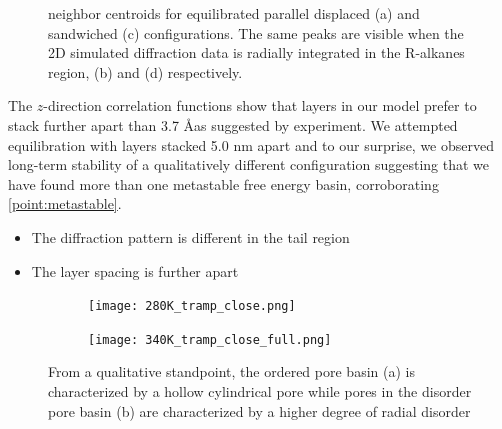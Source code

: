 \documentclass{article}
\newcommand{\angstrom}{\textup{\AA}}
\begin{document}
\begin{figure}
{  neighbor centroids for equilibrated parallel displaced (a) and sandwiched (c) configurations. The
  same peaks are visible when the 2D simulated diffraction data is radially integrated in the R-alkanes region,
  (b) and (d) respectively.}~\label{fig:tail_packing}
  \end{figure}

  The $z$-direction correlation functions show that layers in our model prefer
  to stack further apart than 3.7 \angstrom as suggested by experiment. We
  attempted equilibration with layers stacked 5.0 nm apart and to our surprise,
  we observed long-term stability of a qualitatively different configuration
  suggesting that we have found more than one metastable free energy basin,
  corroborating \ref{point:metastable}.
  \begin{itemize}
 	\item The diffraction pattern is different in the tail region
	\item The layer spacing is further apart
  \end{itemize} 

  \begin{figure}[!ht]
        \centering
        \begin{subfigure}[b]{0.475\textwidth}
                \centering
                \texttt{[image: 280K\_tramp\_close.png]}
                \caption{}\label{fig:OPbasin}
        \end{subfigure}
        \begin{subfigure}[b]{0.475\textwidth}
                \centering
                \texttt{[image: 340K\_tramp\_close\_full.png]}
                \caption{}\label{fig:DPbasin}
        \end{subfigure}
        \caption{From a qualitative standpoint, the ordered pore basin (a) is characterized by a
        hollow cylindrical pore while pores in the disorder pore basin (b) are characterized by a
        higher degree of radial disorder}\label{fig:basins}
  \end{figure}
\end{document}
